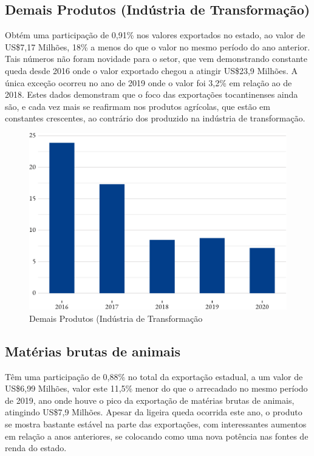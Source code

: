 \subsection {Demais Produtos (Indústria de Transformação)}
\par Obtém uma participação de 0,91\% nos valores exportados no estado, ao valor de US\$7,17 Milhões, 18\% a menos do que o valor no mesmo período do ano anterior. Tais números não foram novidade para o setor, que vem demonstrando constante queda desde 2016 onde o valor exportado chegou a atingir US\$23,9 Milhões. A única exceção ocorreu no ano de 2019 onde o valor foi 3,2\% em relação ao de 2018. Estes dados demonstram que o foco das exportações tocantinenses ainda são, e cada vez mais se reafirmam nos produtos agrícolas, que estão em constantes crescentes, ao contrário dos produzido na indústria de transformação. 

\begin{figure}[h] 
	\caption{Demais Produtos (Indústria de Transformação}
	\includegraphics{fig/transf1-1.pdf}
\end{figure}

\subsection{Matérias brutas de animais}
\par Têm uma participação de 0,88\% no total da exportação estadual, a um valor de US\$6,99 Milhões, valor este 11,5\% menor do que o arrecadado no mesmo período de 2019, ano onde houve o pico da exportação de matérias brutas de animais, atingindo US\$7,9 Milhões. Apesar da ligeira queda ocorrida este ano, o produto se mostra bastante estável na parte das exportações, com interessantes aumentos em relação a anos anteriores, se colocando como uma nova potência nas fontes de renda do estado.

